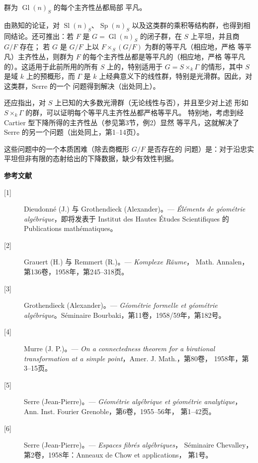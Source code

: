  群为 $\operatorname{Gl}(n)_S$ 的每个主齐性丛都局部
平凡。

由熟知的论证，对 $\operatorname{Sl}(n)_S$、$\operatorname{Sp}(n)_S$
以及这类群的乘积等结构群，也得到相同结论。还可推出：若 $F$ 是
$G=\operatorname{Gl}(n)_S$ 的闭子群，在 $S$ 上平坦，并且商 $G/F$ 存在；
若 $G$ 是 $G/F$ 上以 $F\times_S(G/F)$ 为群的等平凡（相应地，严格
等平凡）主齐性丛，则群为 $F$ 的每个主齐性丛都是等平凡的（相应地，严格
等平凡的）。这适用于此前所用的所有 $S$ 上的，特别适用于
$G=S\times_k\Gamma$ 的情形，其中 $S$ 是域 $k$ 上的预概形，而 $\Gamma$
是 $k$ 上经典意义下的线性群，特别是光滑群。因此，对这类群，Serre 的一个
问题得到解决（出处同上）。

还应指出，对 $S$ 上已知的大多数光滑群（无论线性与否），并且至少对上述
形如 $S\times_k\Gamma$ 的群，可以证明每个等平凡主齐性丛都严格等平凡。
特别地，考虑到经 Cartier 型下降所得的主齐性丛（参见第3节，例2）显然
等平凡，这就解决了 Serre 的另一个问题（出处同上，第1--14页）。

 这些问题中的一个本质困难（除去商概形 $G/F$ 是否存在的
问题）是：对于沿忠实平坦但非有限的态射给出的下降数据，缺少有效性判据。

\begin{center}
  \textbf{参考文献}
\end{center}

\begin{description}
  \item[{[1]}] Dieudonné (J.) 与 Grothendieck (Alexander)。---
    \emph{Éléments de géométrie algébrique}，即将发表于 Institut des
    Hautes Études Scientifiques 的 Publications mathématiques。
  \item[{[2]}] Grauert (H.) 与 Remmert (R.)。--- \emph{Komplexe Räume}，
    Math. Annalen，第136卷，1958年，第245--318页。
  \item[{[3]}] Grothendieck (Alexander)。--- \emph{Géométrie formelle et
    géométrie algébrique}。Séminaire Bourbaki，第11卷，1958/59年，第182号。
  \item[{[4]}] Murre (J. P.)。--- \emph{On a connectedness theorem for a
    birational transformation at a simple point}，Amer. J. Math.，第80卷，
    1958年，第3--15页。
  \item[{[5]}] Serre (Jean-Pierre)。--- \emph{Géométrie algébrique et
    géométrie analytique}，Ann. Inst. Fourier Grenoble，第6卷，1955--56年，
    第1--42页。
  \item[{[6]}] Serre (Jean-Pierre)。--- \emph{Espaces fibrés algébriques}，
    Séminaire Chevalley，第2卷，1958年：Anneaux de Chow et applications，
    第1号。
\end{description}

\par
